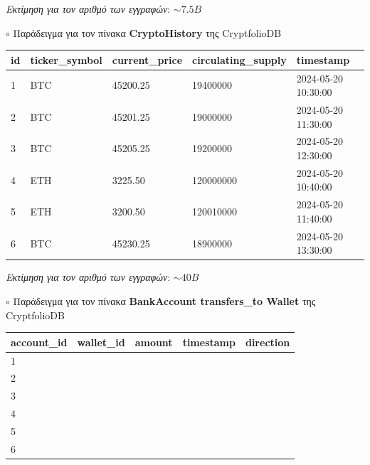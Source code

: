 \documentclass[a4paper,12pt]{article}
\begin{document}
\begin{flushright}
\textit{Εκτίμηση για τον αριθμό των εγγραφών}: $\sim7.5B$
\end{flushright}


\bigskip
\noindent $\circ$ Παράδειγμα για τον πίνακα \textbf{CryptoHistory} της CryptfolioDB

\noindent 
\begin{tabular}{|l|l|l|l|l|}
    \hline
    \textbf{id} & \textbf{ticker\_symbol} & \textbf{current\_price} & \textbf{circulating\_supply} & \textbf{timestamp} \\
    \hline
    1 & BTC & 45200.25 & 19400000 & 2024-05-20 10:30:00 \\
    \hline
    2 & BTC & 45201.25 & 19000000 & 2024-05-20 11:30:00 \\
    \hline
    3 & BTC & 45205.25 & 19200000 & 2024-05-20 12:30:00 \\
    \hline
    4 & ETH & 3225.50 & 120000000 & 2024-05-20 10:40:00 \\
    \hline
    5 & ETH & 3200.50 & 120010000 & 2024-05-20 11:40:00 \\
    \hline
    6 & BTC & 45230.25 & 18900000 & 2024-05-20 13:30:00 \\
    \hline
\end{tabular}

\begin{flushright}
\textit{Εκτίμηση για τον αριθμό των εγγραφών}: $\sim40B$
\end{flushright}

\bigskip
\noindent $\circ$ Παράδειγμα για τον πίνακα \textbf{BankAccount transfers\_to Wallet} της CryptfolioDB

\noindent 
\begin{tabular}{|l|l|l|l|l|}
    \hline
    \textbf{account\_id} & \textbf{wallet\_id} & \textbf{amount} & \textbf{timestamp} & \textbf{direction} \\
    \hline
    1 &  &  &  &  \\
    \hline
    2 &  &  &  &  \\
    \hline
    3 &  &  &  &  \\
    \hline
    4 &  &  &  &  \\
    \hline
    5 &  &  &  &  \\
    \hline
    6 &  &  &  &  \\
    \hline
\end{tabular}
\end{document}
